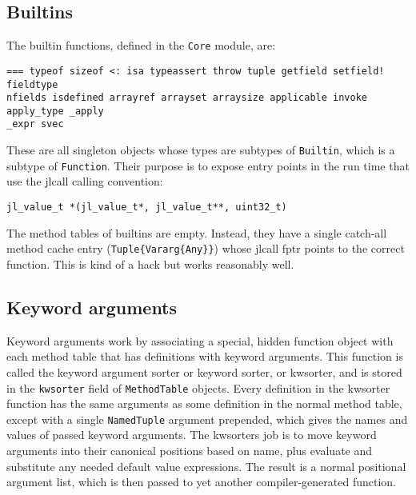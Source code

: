 \hypertarget{4994602509934264781}{}


\subsection{Builtins}



The {\textquotedbl}builtin{\textquotedbl} functions, defined in the \texttt{Core} module, are:




\begin{lstlisting}
=== typeof sizeof <: isa typeassert throw tuple getfield setfield! fieldtype
nfields isdefined arrayref arrayset arraysize applicable invoke apply_type _apply
_expr svec
\end{lstlisting}



These are all singleton objects whose types are subtypes of \texttt{Builtin}, which is a subtype of \texttt{Function}. Their purpose is to expose entry points in the run time that use the {\textquotedbl}jlcall{\textquotedbl} calling convention:




\begin{lstlisting}
jl_value_t *(jl_value_t*, jl_value_t**, uint32_t)
\end{lstlisting}



The method tables of builtins are empty. Instead, they have a single catch-all method cache entry (\texttt{Tuple\{Vararg\{Any\}\}}) whose jlcall fptr points to the correct function. This is kind of a hack but works reasonably well.



\hypertarget{51534660369225743}{}


\subsection{Keyword arguments}



Keyword arguments work by associating a special, hidden function object with each method table that has definitions with keyword arguments. This function is called the {\textquotedbl}keyword argument sorter{\textquotedbl} or {\textquotedbl}keyword sorter{\textquotedbl}, or {\textquotedbl}kwsorter{\textquotedbl}, and is stored in the \texttt{kwsorter} field of \texttt{MethodTable} objects. Every definition in the kwsorter function has the same arguments as some definition in the normal method table, except with a single \texttt{NamedTuple} argument prepended, which gives the names and values of passed keyword arguments. The kwsorter{\textquotesingle}s job is to move keyword arguments into their canonical positions based on name, plus evaluate and substitute any needed default value expressions. The result is a normal positional argument list, which is then passed to yet another compiler-generated function.




